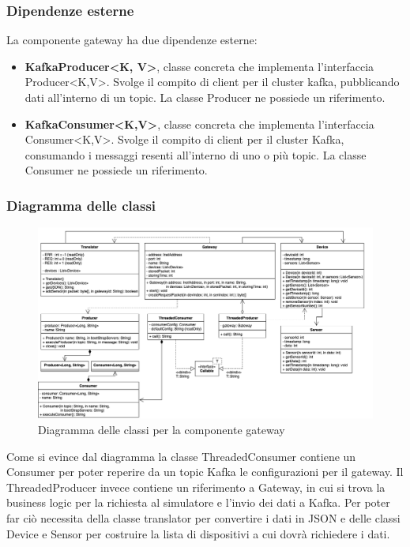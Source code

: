 	\subsubsection{Dipendenze esterne}	
		La componente gateway ha due dipendenze esterne: 
			\begin{itemize}
				\item \textbf{KafkaProducer<K, V>}, classe concreta che implementa l'interfaccia Producer<K,V>. Svolge il compito di client per il cluster kafka, pubblicando dati all'interno di un topic. La classe Producer ne possiede un riferimento.
				\item \textbf{KafkaConsumer<K,V>}, classe concreta che implementa l'interfaccia Consumer<K,V>. Svolge il compito di client per il cluster Kafka, consumando i messaggi resenti all'interno di uno o più topic. La classe Consumer ne possiede un riferimento.
			\end{itemize}	
		\newpage		

	\begin{landscape}
		\subsubsection{Diagramma delle classi}%
		  	\begin{figure}[H]
				\centering
				\includegraphics[scale=0.499]{res/images/GATEWAY/ClassiGateway.png}
				\caption{Diagramma delle classi per la componente gateway}
				\label{Diagramma 2}
			\end{figure}
	Come si evince dal diagramma la classe ThreadedConsumer contiene un Consumer per poter reperire da un topic Kafka le configurazioni per il gateway.
	\newline
	Il ThreadedProducer invece contiene un riferimento a Gateway, in cui si trova la business logic per la richiesta al simulatore e l'invio dei dati a Kafka. Per poter far ciò necessita della classe translator per convertire i dati in JSON e delle classi Device e Sensor per costruire la lista di dispositivi a cui dovrà richiedere i dati.
	\end{landscape}
		
